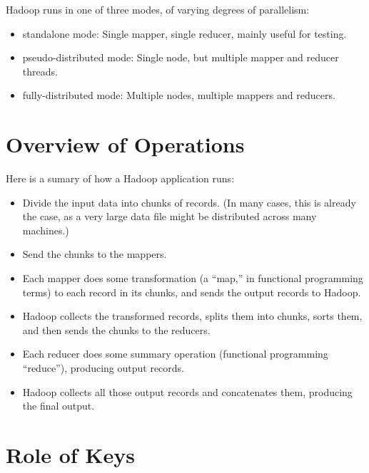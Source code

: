 Hadoop runs in one of three modes, of varying degrees of parallelism:

\begin{itemize}

\item standalone mode:  Single mapper, single reducer, mainly useful for
testing.

\item pseudo-distributed mode:  Single node, but multiple mapper and
reducer threads.

\item fully-distributed mode:  Multiple nodes, multiple mappers and
reducers.

\end{itemize}

\section{Overview of Operations}

Here is a sumary of how a Hadoop application runs:

\begin{itemize}

\item Divide the input data into chunks of records.  (In many cases,
this is already the case, as a very large data file might be distributed
across many machines.)

\item Send the chunks to the mappers.

\item Each mapper does some transformation (a ``map,'' in functional
programming terms) to each record in its chunks, and sends the output
records to Hadoop.

\item Hadoop collects the transformed records, splits them into chunks,
sorts them, and then sends the chunks to the reducers.

\item Each reducer does some summary operation (functional programming
``reduce''), producing output records.

\item Hadoop collects all those output records and concatenates
them, producing the final output.

\end{itemize}

\section{Role of Keys}

